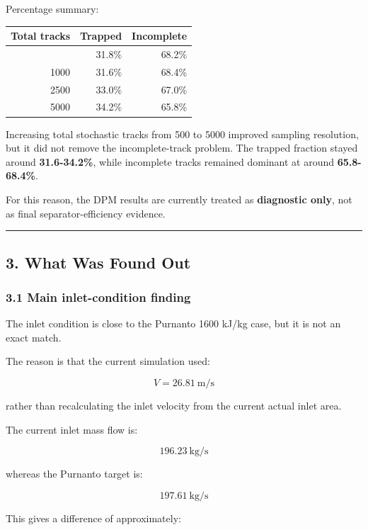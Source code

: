 \documentclass[
  11pt,
]{article}
\newcounter{none} %
\begin{document}
Percentage summary:

{\def\LTcaptype{none} %
\begin{longtable}[]{@{}rrr@{}}
\toprule\noalign{}
Total tracks & Trapped & Incomplete \\
\midrule\noalign{}
\endhead
\bottomrule\noalign{}
\endlastfoot
500 & 31.8\% & 68.2\% \\
1000 & 31.6\% & 68.4\% \\
2500 & 33.0\% & 67.0\% \\
5000 & 34.2\% & 65.8\% \\
\end{longtable}
}

Increasing total stochastic tracks from 500 to 5000 improved sampling
resolution, but it did not remove the incomplete-track problem. The
trapped fraction stayed around \textbf{31.6-34.2\%}, while incomplete
tracks remained dominant at around \textbf{65.8-68.4\%}.

For this reason, the DPM results are currently treated as
\textbf{diagnostic only}, not as final separator-efficiency evidence.

\begin{center}\rule{0.5\linewidth}{0.5pt}\end{center}

\subsection{3. What Was Found Out}\label{what-was-found-out}

\subsubsection{3.1 Main inlet-condition
finding}\label{main-inlet-condition-finding}

The inlet condition is close to the Purnanto 1600 kJ/kg case, but it is
not an exact match.

The reason is that the current simulation used:

\[
V = 26.81\ \text{m/s}
\]

rather than recalculating the inlet velocity from the current actual
inlet area.

The current inlet mass flow is:

\[
196.23\ \text{kg/s}
\]

whereas the Purnanto target is:

\[
197.61\ \text{kg/s}
\]

This gives a difference of approximately:
\end{document}
